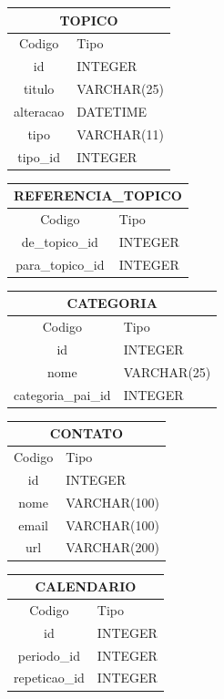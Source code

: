 \documentclass[a4paper,12pt]{article}
\begin{document}
	\begin{multicols}{2}

		\begin{tabular}{|c|l|} \hline
			\multicolumn{2}{|c|}{TOPICO} \\ \hline
			Codigo & Tipo \\ \hline
			id & INTEGER \\
			titulo & VARCHAR(25) \\
			alteracao & DATETIME \\
			tipo & VARCHAR(11) \\
			tipo\_id & INTEGER \\ \hline
		\end{tabular}
		
		\begin{tabular}{|c|l|} \hline
			\multicolumn{2}{|c|}{REFERENCIA\_TOPICO} \\ \hline
			Codigo & Tipo \\ \hline
			de\_topico\_id  & INTEGER \\
			para\_topico\_id & INTEGER \\ \hline
		\end{tabular}
		
		\begin{tabular}{|c|l|} \hline
			\multicolumn{2}{|c|}{CATEGORIA} \\ \hline
			Codigo & Tipo \\ \hline
			id & INTEGER \\
			nome & VARCHAR(25) \\
			categoria\_pai\_id & INTEGER \\ \hline
		\end{tabular}
			
		\begin{tabular}{|c|l|} \hline
			\multicolumn{2}{|c|}{CONTATO} \\ \hline
			Codigo & Tipo \\ \hline
			id & INTEGER \\
			nome & VARCHAR(100) \\ 
			email & VARCHAR(100) \\
			url & VARCHAR(200) \\ \hline
		\end{tabular}

		\begin{tabular}{|c|l|} \hline
			\multicolumn{2}{|c|}{CALENDARIO} \\ \hline
			Codigo & Tipo \\ \hline
			id & INTEGER \\
			periodo\_id & INTEGER \\ 
			repeticao\_id & INTEGER \\ \hline
		\end{tabular}
		

\end{multicols}
\end{document}
